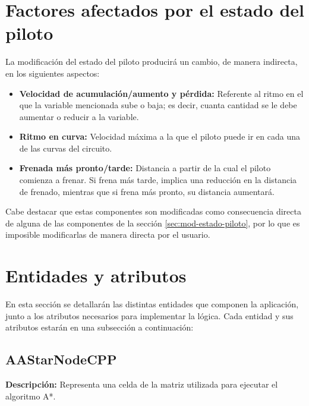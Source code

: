 \section{Factores afectados por el estado del piloto}
\label{sec:componente-estado}

La modificación del estado del piloto producirá un cambio, de manera indirecta, en los siguientes aspectos:

\begin{itemize}
    \item \textbf{Velocidad de acumulación/aumento y pérdida: }Referente al ritmo en el que la variable mencionada sube o baja; es decir, cuanta cantidad se le debe aumentar o reducir a la variable.
    \item \textbf{Ritmo en curva: }Velocidad máxima a la que el piloto puede ir en cada una de las curvas del circuito.
    \item \textbf{Frenada más pronto/tarde: }Distancia a partir de la cual el piloto comienza a frenar. Si frena más tarde, implica una reducción en la distancia de frenado, mientras que si frena más pronto, su distancia aumentará.
\end{itemize}

Cabe destacar que estas componentes son modificadas como consecuencia directa de alguna de las componentes de la sección \ref{sec:mod-estado-piloto}, por lo que es imposible modificarlas de manera directa por el usuario.

\section{Entidades y atributos}

En esta sección se detallarán las distintas entidades que componen la aplicación, junto a los atributos necesarios para implementar la lógica. Cada entidad y sus atributos estarán en una subsección a continuación:

\subsection{AAStarNodeCPP}
\textbf{Descripción: }Representa una celda de la matriz utilizada para ejecutar el algoritmo A*.


